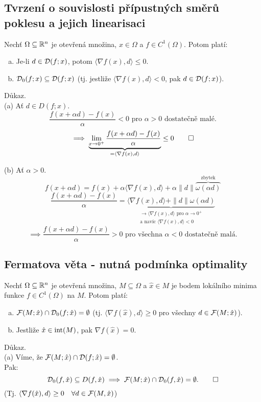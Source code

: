 \subsection{Tvrzení o souvislosti přípustných směrů poklesu a jejich linearisaci}
Nechť $\Omega \subseteq \mathbb{R}^n$ je otevřená množina, $x \in \Omega$ a $f \in C^1(\Omega)$. Potom platí:
\begin{enumerate}[(a)]
    \item Je-li $d \in \mathcal{D}(f; x)$, potom $\langle \nabla f(x), d\rangle \leq 0$.
    \item $\mathcal{D}_0(f;x) \subseteq \mathcal{D}(f;x)$ (tj. jestliže $\langle \nabla f(x), d\rangle < 0$, pak $d \in \mathcal{D}(f;x)$).
\end{enumerate}
Důkaz.\\
(a) Ať $d \in D(f;x)$.
\[
    \frac{f(x + \alpha d) - f(x)}{\alpha} < 0 \text{ pro } \alpha > 0 \text{ dostatečně malé.}
\]
\[
    \implies \underbrace{\lim_{x\rightarrow 0^+ } \frac{f(x+\alpha d) - f(x)}{\alpha}}_{= \langle \nabla f(x), d\rangle}
    \leq 0 \qed
\]

(b) Ať $\alpha > 0$.
\[
    f(x+\alpha d) = f(x) + \alpha \langle \nabla f(x), d\rangle + \alpha \| d\|
    \overbrace{\omega (\alpha d)}^{\text{zbytek}}
\]
\[
    \frac{f(x+\alpha d) - f(x)}{\alpha} = \underbrace{\langle \nabla f(x), d\rangle + \| d\| \omega (\alpha d)}_{
    \substack{\rightarrow \langle \nabla f(x), d\rangle \text{ pro } \alpha \rightarrow 0^+ \\ \text{a navíc }
    \langle\nabla f(x), d \rangle < 0}} 
\]
\[
    \implies \frac{f(x + \alpha d) - f(x)}{\alpha} > 0 \text{ pro všechna } \alpha < 0 \text{ dostatečně malá.}
\]

\subsection{Fermatova věta - nutná podmínka optimality}\label{fermat}
Nechť $\Omega \subseteq \mathbb{R}^n$ je otevřená množina, $M \subseteq \Omega$ a $\hat x \in M$ je bodem lokálního minima
funkce $f \in C^1(\Omega)$ na $M$. Potom platí:
\begin{enumerate}[(a)]
    \item $\mathcal{F}(M; \hat x) \cap \mathcal{D}_0(f; \hat x) = \emptyset$ (tj. $\langle \nabla f(\hat x), d\rangle \geq 0$ pro všechny
    $d \in \mathcal{F}(M; \hat x)$).
    \item Jestliže $\hat x \in \operatorname*{int}(M)$, pak $\nabla f(\hat x) = 0$.
\end{enumerate}
Důkaz.\\
(a) Víme, že $\mathcal{F}(M; \hat x) \cap \mathcal{D}(f; \hat x) = \emptyset$.\\ \label{fermatA}
Pak:
\[
    \mathcal{D}_0 (f, \hat x) \subseteq D(f, \hat x) \implies \mathcal{F}(M; \hat x) \cap \mathcal{D}_0(f, \hat x) = \emptyset. \qed
\]
(Tj. $\langle \nabla f(\hat x), d\rangle \geq 0 \quad \forall d \in \mathcal{F}(M, \hat x)$)

